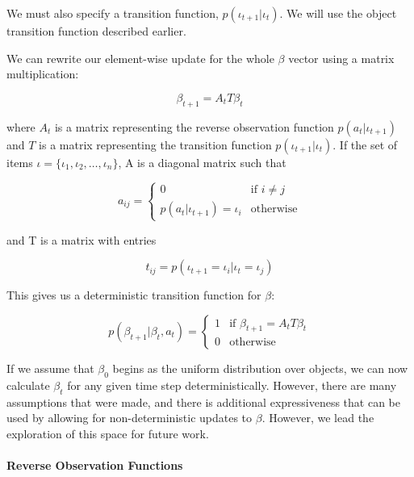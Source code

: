 \documentclass[conference]{IEEEtran}
\begin{document}
We must also specify a transition function, $p(\iota_{t+1} | \iota_t)$. We will use the object transition function described earlier. 

We can rewrite our element-wise update for the whole $\beta$ vector using a matrix multiplication: 


$$\beta_{t+1} = A_{t}T \beta_{t}$$


where $A_{t}$ is a matrix representing the reverse observation function $p(a_{t} | \iota_{t+1})$ and $T$ is a matrix representing the transition function $p(\iota_{t+1}|\iota_{t})$.  If the set of items $\mathcal{\iota} = \{ \iota_1, \iota_2, \ldots, \iota_n\}$, A is a diagonal matrix such that

\begin{equation*}
	a_{ij} = \begin{cases}
		0 & \text{if } i \ne j \\
		p(a_t | \iota_{t+1}) = \iota_i & \text{otherwise}
	\end{cases}
\end{equation*}

and T is a matrix with entries

\begin{equation*}
	t_{ij} = p(\iota_{t+1} = \iota_i | \iota_{t} = \iota_j)
\end{equation*}
		


This gives us a deterministic transition function for $\beta$: 

\begin{equation}
	p(\beta_{t+1} | \beta_t, a_t) = \begin{cases}
		1 & \text{if } \beta_{t+1} = A_t T \beta_t \\
		0 & \text{otherwise}
	\end{cases}
\end{equation}

If we assume that $\beta_0$ begins as the uniform distribution over objects, we can now calculate $\beta_t$ for any given time step deterministically. However, there are many assumptions that were made, and there is additional expressiveness that can be used by allowing for non-deterministic updates to $\beta$. However, we lead the exploration of this space for future work. 

\paragraph{Reverse Observation Functions} \label{reverse}
\end{document}
